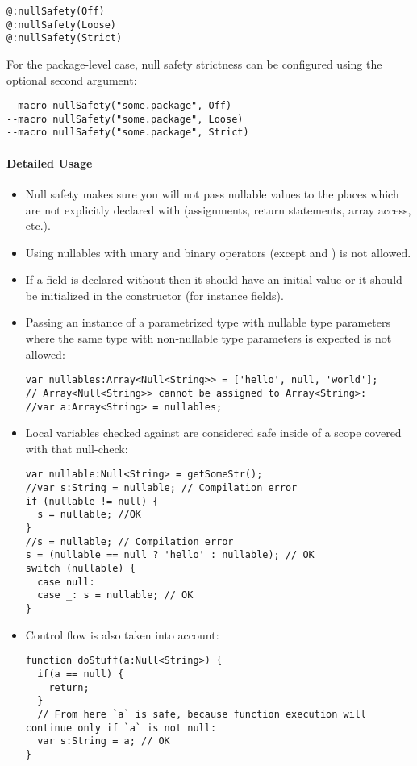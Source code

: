 \begin{lstlisting}
@:nullSafety(Off)
@:nullSafety(Loose)
@:nullSafety(Strict)
\end{lstlisting}

For the package-level case, null safety strictness can be configured using the optional second argument:

\begin{lstlisting}
--macro nullSafety("some.package", Off)
--macro nullSafety("some.package", Loose)
--macro nullSafety("some.package", Strict)
\end{lstlisting}

\paragraph{Detailed Usage}

\begin{itemize}
    \item Null safety makes sure you will not pass nullable values to the places which are not explicitly declared with  (assignments, return statements, array access, etc.).
    \item Using nullables with unary and binary operators (except \expr{==} and \expr{!=}) is not allowed.
    \item If a field is declared without  then it should have an initial value or it should be initialized in the constructor (for instance fields).
    \item Passing an instance of a parametrized type with nullable type parameters where the same type with non-nullable type parameters is expected is not allowed:
    \begin{lstlisting}
var nullables:Array<Null<String>> = ['hello', null, 'world'];
// Array<Null<String>> cannot be assigned to Array<String>:
//var a:Array<String> = nullables;
\end{lstlisting}
    \item Local variables checked against  are considered safe inside of a scope covered with that null-check:
    \begin{lstlisting}
var nullable:Null<String> = getSomeStr();
//var s:String = nullable; // Compilation error
if (nullable != null) {
  s = nullable; //OK
}
//s = nullable; // Compilation error
s = (nullable == null ? 'hello' : nullable); // OK
switch (nullable) {
  case null:
  case _: s = nullable; // OK
}
\end{lstlisting}
    \item Control flow is also taken into account:
    \begin{lstlisting}
function doStuff(a:Null<String>) {
  if(a == null) {
    return;
  }
  // From here `a` is safe, because function execution will continue only if `a` is not null:
  var s:String = a; // OK
}
\end{lstlisting}
\end{itemize}

